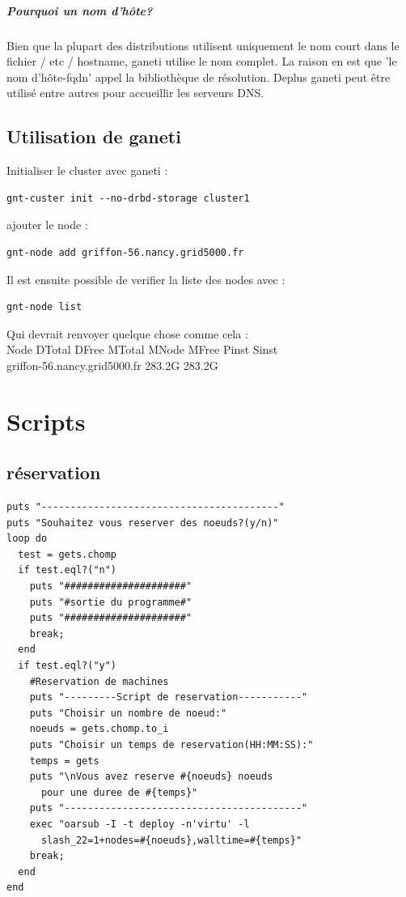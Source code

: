 \documentclass[a4paper,11pt]{report}
\begin{document}
\paragraph{\textbf{Pourquoi un nom d'hôte?} }
Bien que la plupart des distributions utilisent uniquement 
le nom court dans le fichier / etc / hostname, ganeti utilise le nom 
complet. La raison en est que 'le nom d'hôte-fqdn' appel la bibliothèque de résolution. Deplus ganeti peut être utilisé entre 
autres pour accueillir les serveurs DNS.

\section{Utilisation de ganeti}
Initialiser le cluster avec ganeti :
\begin{lstlisting}
gnt-custer init --no-drbd-storage cluster1
\end{lstlisting}
ajouter le node :
\begin{lstlisting}
gnt-node add griffon-56.nancy.grid5000.fr
\end{lstlisting}

Il est ensuite possible de verifier la liste des nodes avec :
\begin{lstlisting}
gnt-node list
\end{lstlisting}
Qui devrait renvoyer quelque chose comme cela :\\
Node                         DTotal  DFree MTotal MNode MFree Pinst Sinst\\
griffon-56.nancy.grid5000.fr 283.2G 283.2G  
    
  \newpage
    \chapter{Scripts}
      \section{réservation}
      \begin{lstlisting}
puts "-----------------------------------------"
puts "Souhaitez vous reserver des noeuds?(y/n)"
loop do
  test = gets.chomp
  if test.eql?("n")
    puts "#####################"
    puts "#sortie du programme#"
    puts "#####################"
    break;
  end
  if test.eql?("y")
    #Reservation de machines                                                 
    puts "---------Script de reservation-----------"
    puts "Choisir un nombre de noeud:"
    noeuds = gets.chomp.to_i
    puts "Choisir un temps de reservation(HH:MM:SS):"
    temps = gets
    puts "\nVous avez reserve #{noeuds} noeuds 
	  pour une duree de #{temps}"
    puts "-----------------------------------------"
    exec "oarsub -I -t deploy -n'virtu' -l 
	  slash_22=1+nodes=#{noeuds},walltime=#{temps}"
    break;
  end
end
      \end{lstlisting}
      
\end{document}
